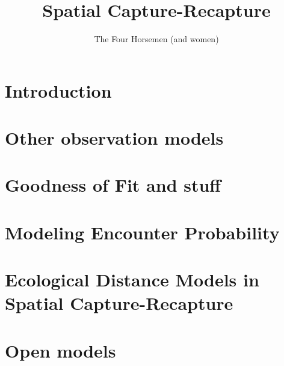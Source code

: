 \documentclass{book}
\begin{document}
\title{ Spatial Capture-Recapture  }
\subtitle{
}
\author{The Four Horsemen (and women) }

\address{
USGS Patuxent Wildlife Research Center \\
North Carolina State University
}

\maketitle

\newpage

\setcounter{tocdepth}{2}
\tableofcontents

\chapter{Introduction}
\label{chapt.intro}







\chapter{Other observation models}
\label{chapt.poisson}

%





\chapter{Goodness of Fit and stuff}
\label{chapt.gof}

\chapter{Modeling Encounter Probability}
\label{chapt.covariates}

\chapter{Ecological Distance Models in Spatial Capture-Recapture}
\label{chapt.ecoldist}




\chapter{Open models}
\label{chapt.open}








\printindex


\end{document}
